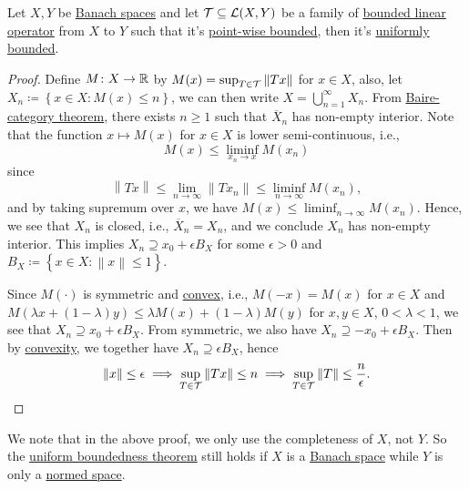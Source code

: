 \begin{theorem}\label{thm:uniform-boundedness}
	Let \(X, Y\) be \hyperref[def:Banach-space]{Banach spaces} and let \(\mathcal{\MakeUppercase{T}} \subseteq \mathcal{\MakeUppercase{l}} (X, Y)\) be a family of \hyperref[def:bounded-linear-op]{bounded linear operator} from \(X\) to \(Y\) such that it's \hyperref[def:point-wise-bounded]{point-wise bounded}, then it's \hyperref[def:uniformly-bounded]{uniformly bounded}.
\end{theorem}
\begin{proof}
	Define \(M\colon X\to \mathbb{\MakeUppercase{r}} \) by \(M(x) = \sup _{T\in \mathcal{\MakeUppercase{t}} }\left\lVert Tx\right\rVert \) for \(x\in X\), also, let \(X_n \coloneqq \left\{ x\in X\colon M(x) \leq n \right\}\), we can then write \(X = \bigcup_{n=1}^{\infty} X_n\). From \hyperref[prop:Baire-category]{Baire-category theorem}, there exists \(n \geq 1\) such that \(\overline{X} _n\) has non-empty interior. Note that the function \(x \mapsto M(x)\) for \(x\in X\) is lower semi-continuous, i.e.,
	\[
		M(x) \leq \liminf_{x_n \to x} M(x_n)
	\]
	since
	\[
		\left\lVert Tx\right\rVert \leq \lim\limits_{n \to \infty} \left\lVert Tx_n\right\rVert \leq \liminf_{n \to \infty} M(x_n),
	\]
	and by taking supremum over \(x\), we have \(M(x) \leq \liminf_{n \to \infty} M(x_n)\). Hence, we see that \(X_n\) is closed, i.e., \(\overline{X} _n = X_n\), and we conclude \(X_n\) has non-empty interior. This implies \(X_n \supseteq x_{0} + \epsilon B_X\) for some \(\epsilon > 0\) and \(B_X\coloneqq \left\{ x\in X\colon \left\lVert x\right\rVert \leq 1 \right\} \).

	Since \(M(\cdot)\) is symmetric and \hyperref[def:convex-function]{convex}, i.e., \(M(-x) = M(x)\) for \(x\in X\) and \(M(\lambda x + (1 - \lambda )y) \leq \lambda M(x) + (1 - \lambda )M(y)\) for \(x, y\in X\), \(0 < \lambda < 1\), we see that \(X_n \supseteq x_0 + \epsilon B_X\). From symmetric, we also have \(X_n \supseteq -x_0 + \epsilon B_X\). Then by \hyperref[def:convex-function]{convexity}, we together have \(X_n \supseteq \epsilon B_X\), hence
	\[
		\left\lVert x\right\rVert \leq \epsilon \implies \sup _{T\in \mathcal{\MakeUppercase{t}} } \left\lVert Tx\right\rVert \leq n\implies \sup _{T\in \mathcal{\MakeUppercase{t}} } \left\lVert T\right\rVert \leq \frac{n}{\epsilon }.
	\]
\end{proof}

We note that in the above proof, we only use the completeness of \(X\), not \(Y\). So the \hyperref[thm:uniform-boundedness]{uniform boundedness theorem} still holds if \(X\) is a \hyperref[def:Banach-space]{Banach space} while \(Y\) is only a \hyperref[def:normed-vector-space]{normed space}.

